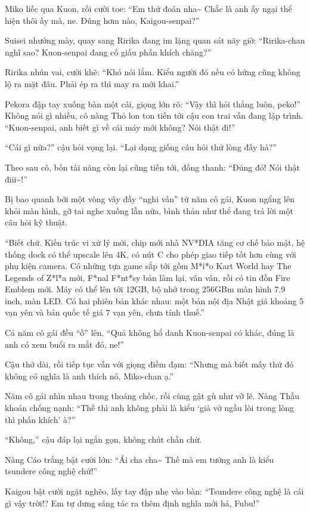 \documentclass[../main.tex]{subfiles}
\begin{document}
Miko liếc qua Kuon, rồi cười toe: ``Em thử đoán nha\~{} Chắc là anh ấy ngại thể hiện thôi ấy mà, ne. Đúng hơm nào, Kaigou-senpai?''

Suisei nhướng mày, quay sang Ririka đang im lặng quan sát nãy giờ: ``Ririka-chan nghĩ sao? Kuon-senpai đang cố giấu phấn khích chăng?''

Ririka nhún vai, cười khẽ: ``Khó nói lắm. Kiểu người đó nếu có hứng cũng không lộ ra mặt đâu. Phải ép ra thì may ra mới khai.''

Pekora đập tay xuống bàn một cái, giọng lớn rõ: ``Vậy thì hỏi thẳng luôn, peko!'' Không nói gì nhiều, cô nàng Thỏ lon ton tiến tới cậu con trai vẫn đang lập trình. ``Kuon-senpai, anh biết gì về cái máy mới không? Nói thật đi!''

``Cái gì nữa?'' cậu hỏi vọng lại. ``Lại dạng giống câu hỏi thử lòng đấy hả?''

Theo sau cô, bốn tài năng còn lại cũng tiến tới, đồng thanh: ``Đúng đó! Nói thật điii\~{}!''

Bị bao quanh bởi một vòng vây đầy ``nghi vấn'' từ năm cô gái, Kuon ngẩng lên khỏi màn hình, gỡ tai nghe xuống lần nữa, bình thản như thể đang trả lời một câu hỏi kỹ thuật.

``Biết chứ. Kiến trúc vi xử lý mới, chip mới nhà NV*DIA tăng cơ chế bảo mật, hệ thống dock có thể upscale lên 4K, có nút C cho phép giao tiếp tốt hơn cùng với phụ kiện camera. Có những tựa game sắp tới gồm M*i*o Kart World hay The Legends of Z*l*a mới, F*nal F*nt*sy bản làm lại, vân vân, rồi có tin đồn Fire Emblem mới. Máy có thể lên tới 12GB, bộ nhớ trong 256GBm màn hình 7.9 inch, màn LED. Có hai phiên bản khác nhau: một bản nội địa Nhật giá khoảng 5 vạn yên và bản quốc tế giá 7 vạn yên, chưa tính thuế.''

Cả năm cô gái đều ``ồ'' lên. ``Quả không hổ danh Kuon-senpai có khác, đúng là anh có xem buổi ra mắt đó, ne!''

Cậu thở dài, rồi tiếp tục vẫn với giọng điềm đạm: ``Nhưng mà biết mấy thứ đó không có nghĩa là anh thích nó, Miko-chan ạ.''

Năm cô gái nhìn nhau trong thoáng chốc, rồi cùng gật gù như vỡ lẽ. Nàng Thầu khoán chống nạnh: ``Thế thì anh không phải là kiểu `giả vờ ngầu lòi trong lòng thì phấn khích' à?''

``Không,'' cậu đáp lại ngắn gọn, không chút chần chừ.

Nàng Cáo trắng bật cười lớn: ``Ái cha cha\~{} Thế mà em tưởng anh là kiểu tsundere công nghệ chứ!''

Kaigou bật cười ngặt nghẽo, lấy tay đập nhẹ vào bàn: ``Tsundere công nghệ là cái gì vậy trời!? Em tự dưng sáng tác ra thêm định nghĩa mới hả, Fubu!''
\end{document}
